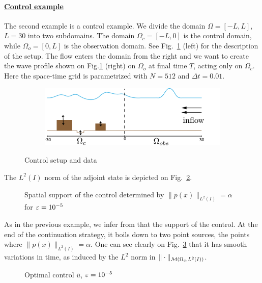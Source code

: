 \paragraph{\underline{Control example}}
The second example is a control example. We divide the domain $\Omega = [-L,L]$, $L=30$ into two subdomains. The domain $\Omega_c = [-L,0]$ is the control domain, while $\Omega_{o} = [0,L]$ is the observation domain. See Fig.~\ref{controlsetup} (left) for the description of the setup. The flow enters the domain from the right and we want to create the wave profile shown on Fig.\ref{controlsetup} (right) on $\Omega_{o}$ at final time $T$, acting only on $\Omega_c$. Here the space-time grid is parametrized with $N = 512$ and $\Delta t = 0.01$.
\begin{figure}[htb]
\begin{subfigure}[b]{0.5\textwidth}
\centering
\includegraphics[width=\textwidth, height=3cm]{images/control_setup.png}
\end{subfigure}\qquad
\begin{subfigure}[b]{0.5\textwidth}
\centering

\end{subfigure}
\caption{Control setup and data}
\label{controlsetup}
\end{figure}
The $L^2(I)$ norm of the adjoint state is depicted on Fig.~\ref{supportIP}.
\begin{figure}[htb]
\centering

\caption{Spatial support of the control determined by $\|\bar p(x)\|_{L^2(I)}=\alpha$ for $\varepsilon= 10^{-5}$}
\label{supportIP}
\end{figure}
As in the previous example, we infer from that the support of the control. At the end of the continuation strategy, it boils down to two point sources, the points where $\|p(x)\|_{L^2(I)} = \alpha$. One can see clearly on Fig.~\ref{recoveredcontrol2} that it has smooth variations in time, as induced by the $L^2$ norm in $\|\cdot\|_{\mathcal{M}(\Omega_c, L^{2}(I))}$.
\begin{figure}[htb]
 \begin{subfigure}[b]{0.48\textwidth}
 \centering
 
 \end{subfigure}\qquad
 \begin{subfigure}[b]{0.48\textwidth}
 \centering
 
 \end{subfigure}
 \caption{Optimal control $\bar u$, $\varepsilon = 10^{-5}$}
 \label{recoveredcontrol2}
\end{figure}
